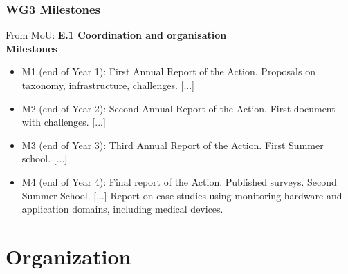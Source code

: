 \documentclass{beamer}
\begin{document}
\begin{frame}
  \frametitle{WG3 Milestones}

  From MoU: \textbf{E.1 Coordination and organisation}\\[2em]

  \textbf{Milestones}\\[2em]
  
\begin{itemize}
\item M1 (end of Year 1): First Annual Report of the Action. Proposals
  on taxonomy, infrastructure, \alert{challenges}. [...]
\item M2 (end of Year 2): Second Annual Report of the Action.
  \alert{First document with challenges}. [...]
\item M3 (end of Year 3): Third Annual Report of the Action. First
  Summer school. [...]
\item M4 (end of Year 4): Final report of the Action. \alert{Published
    surveys}. Second Summer School. [...] Report on case studies using
  monitoring hardware and application domains, including medical
  devices.
\end{itemize}

\end{frame}

\section{Organization}
\end{document}
